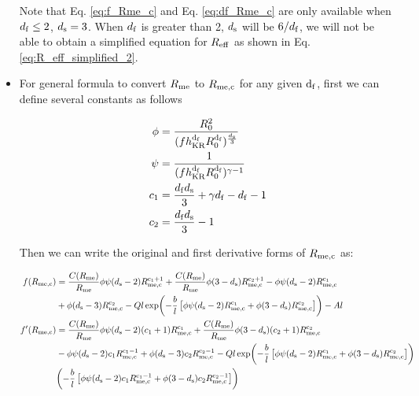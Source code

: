 \documentclass{article}
\begin{document}
\begin{itemize}
Note that Eq. \ref{eq:f_Rme_c} and Eq. \ref{eq:df_Rme_c} are only available when $d_{\rm f} \leq 2$, $d_{\rm s} = 3$.
When $d_{\rm f}$ is greater than 2, $d_{\rm s}$ will be $6/d_{\rm f}$, we will not be able to
obtain a simplified equation for $R_{\rm eff}$ as shown in Eq. \ref{eq:R_eff_simplified_2}.

\item For general formula to convert $R_{\rm me}$ to $R_{\rm me,c}$ for any given $\rm d_{\rm f}$, first we can define several constants as follows

\begin{align}
  \phi &= \frac{R_0^{2}}{(f h_{\rm KR}^{\rm d_{\rm f}} R_0^{\rm d_{\rm f}})^{\frac{d_{\rm s}}{3}}} \\
  \psi &= \frac{1}{(f h_{\rm KR}^{\rm d_{\rm f}} R_0^{\rm d_{\rm f}})^{\gamma - 1}} \\
  c_1 &= \frac{d_{\rm f} d_{\rm s}}{3} + \gamma d_{\rm f} - d_{\rm f} - 1 \\
  c_2 &= \frac{d_{\rm f} d_{\rm s}}{3} - 1
\end{align}

Then we can write the original and first derivative forms of $R_{\rm me,c}$ as:

\begin{align}
  f(R_{\rm me,c}) &= \frac{C(R_{\rm me})}{R_{\rm me}} \phi \psi (d_{\rm s} -2) R_{\rm me,c}^{\rm c_1+1} + \frac{C(R_{\rm me})}{R_{\rm me}} \phi (3-d_{\rm s}) R_{\rm me,c}^{\rm c_2+1} - \phi \psi (d_{\rm s}-2) R_{\rm me,c}^{\rm c_1} \notag \\
  &+ \phi (d_{\rm s} -3) R_{\rm me,c}^{\rm c_2} - Q l \exp\biggl(- \frac{b}{l} \left[\phi \psi (d_{\rm s}-2) R_{\rm me,c}^{\rm c_1} + \phi (3-d_{\rm s}) R_{\rm me,c}^{\rm c_2}\right]\biggr) - A l \\
   f^ \prime (R_{\rm me,c}) &= \frac{C(R_{\rm me})}{R_{\rm me}} \phi \psi (d_{\rm s} -2) (c_1 +1) R_{\rm me,c}^{\rm c_1} + \frac{C(R_{\rm me})}{R_{\rm me}} \phi (3-d_{\rm s}) (c_2+1) R_{\rm me,c}^{\rm c_2} \notag \\
   &- \phi \psi (d_{\rm s}-2) c_1 R_{\rm me,c}^{\rm c_1-1} + \phi (d_{\rm s} -3) c_2 R_{\rm me,c}^{\rm c_2-1} \notag - Q l \exp\biggl(- \frac{b}{l} \left[\phi \psi (d_{\rm s}-2) R_{\rm me,c}^{\rm c_1} + \phi (3-d_{\rm s}) R_{\rm me,c}^{\rm c_2} \right]\biggr) \notag \\
   & \biggl(- \frac{b}{l} \left[\phi \psi (d_{\rm s}-2) c_1 R_{\rm me,c}^{\rm c_1-1} + \phi (3-d_{\rm s}) c_2 R_{\rm me,c}^{\rm c_2-1}\right]\biggr)
\end{align}

\end{itemize}
\end{document}
